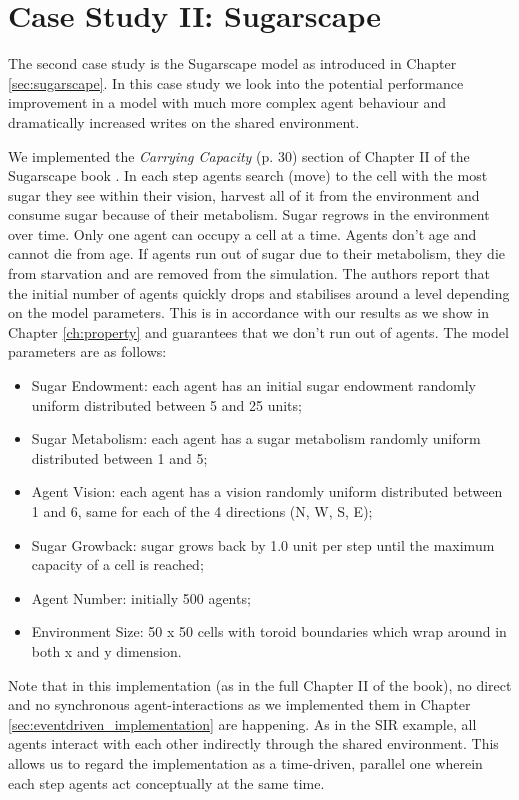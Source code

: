 \section{Case Study II: Sugarscape}
\label{sec:sugarscape_concurrent}
The second case study is the Sugarscape model as introduced in Chapter \ref{sec:sugarscape}. In this case study we look into the potential performance improvement in a model with much more complex agent behaviour and dramatically increased writes on the shared environment.

We implemented the \textit{Carrying Capacity} (p. 30) section of Chapter II of the Sugarscape book \cite{epstein_growing_1996}. In each step agents search (move) to the cell with the most sugar they see within their vision, harvest all of it from the environment and consume sugar because of their metabolism. Sugar regrows in the environment over time. Only one agent can occupy a cell at a time. Agents don't age and cannot die from age. If agents run out of sugar due to their metabolism, they die from starvation and are removed from the simulation. The authors report that the initial number of agents quickly drops and stabilises around a level depending on the model parameters. This is in accordance with our results as we show in Chapter \ref{ch:property} and guarantees that we don't run out of agents. The model parameters are as follows:

\begin{itemize}
	\item Sugar Endowment: each agent has an initial sugar endowment randomly uniform distributed between 5 and 25 units;
	\item Sugar Metabolism: each agent has a sugar metabolism randomly uniform distributed between 1 and 5;
	\item Agent Vision: each agent has a vision randomly uniform distributed between 1 and 6, same for each of the 4 directions (N, W, S, E);
	\item Sugar Growback: sugar grows back by 1.0 unit per step until the maximum capacity of a cell is reached;
	\item Agent Number: initially 500 agents;
	\item Environment Size: 50 x 50 cells with toroid boundaries which wrap around in both x and y dimension.
\end{itemize}

Note that in this implementation (as in the full Chapter II of the book), no direct and no synchronous agent-interactions as we implemented them in Chapter \ref{sec:eventdriven_implementation} are happening. As in the SIR example, all agents interact with each other indirectly through the shared environment. This allows us to regard the implementation as a time-driven, parallel one wherein each step agents act conceptually at the same time.

